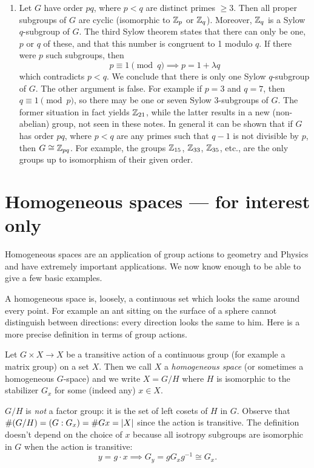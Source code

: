 \begin{examples}{}{}
\begin{enumerate}
		\item Let $G$ have order $pq$, where $p<q$ are distinct primes $\ge 3$. Then all proper subgroups of $G$ are cyclic (isomorphic to $\mathbb{Z}_p$ or $\mathbb{Z}_q$). Moreover, $\mathbb{Z}_q$ is a Sylow $q$-subgroup of $G$. The third Sylow theorem states that there can only be one, $p$ or $q$ of these, and that this number is congruent to 1 modulo $q$. If there were $p$ such subgroups, then
		\[
			p\equiv 1\pmod q\implies p=1+\lambda q \tag{for some $\lambda\in\N$}
		\]
		which contradicts $p<q$. We conclude that there is only one Sylow $q$-subgroup of $G$.\smallbreak
		The other argument is false. For example if $p=3$ and $q=7$, then $q\equiv 1\pmod p$, so there may be one or seven Sylow 3-subgroups of $G$. The former situation in fact yields $\mathbb{Z}_{21}$, while the latter results in a new (non-abelian) group, not seen in these notes.\smallbreak
		In general it can be shown that if $G$ has order $pq$, where $p<q$ are any primes such that $q-1$ is not divisible by $p$, then $G\cong\mathbb{Z}_{pq}$. For example, the groups $\mathbb{Z}_{15}$, $\mathbb{Z}_{33}$, $\mathbb{Z}_{35}$, etc., are the only groups up to isomorphism of their given order.
	\end{enumerate}
\end{examples}

\section*{Homogeneous spaces --- for interest only}

Homogeneous spaces are an application of group actions to geometry and Physics and have extremely important applications. We now know enough to be able to give a few basic examples.

A homogeneous space is, loosely, a continuous set which looks the same around every point. For example an ant sitting on the surface of a sphere cannot distinguish between directions: every direction looks the same to him. Here is a more precise definition in terms of group actions.

\begin{defn}{}{}
Let $G\times X\to X$ be a transitive action of a continuous group (for example a matrix group) on a set $X$. Then we call $X$ a \emph{homogeneous space} (or sometimes a homogeneous $G$-space) and we write $X=G/H$ where $H$ is isomorphic to the stabilizer $G_x$ for some (indeed any) $x\in X$.
\end{defn}

$G/H$ is \emph{not} a factor group: it is the set of left cosets of $H$ in $G$. Observe that $\#(G/H)=(G:G_x)=\# Gx=\left| X\right|$ since the action is transitive. The definition doesn't depend on the choice of $x$ because all isotropy subgroups are isomorphic in $G$ when the action is transitive:
\[y=g\cdot x\implies G_y=gG_xg^{-1}\cong G_x.\]


